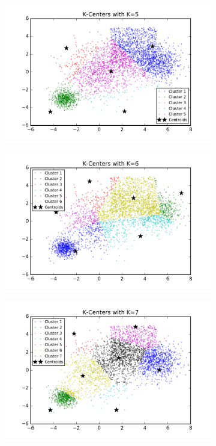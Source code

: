 \begin{figure}[htb]
\begin{subfigure}[b]{0.475\textwidth}
            \includegraphics[width=\textwidth]{./figures/bigClustering_kCenter_5.png}
        \end{subfigure}
        \hfill
        \begin{subfigure}[b]{0.475\textwidth}   
            \centering 
            \includegraphics[width=\textwidth]{./figures/bigClustering_kCenter_6.png}
        \end{subfigure}
        \begin{subfigure}[b]{0.475\textwidth}   
            \centering 
            \includegraphics[width=\textwidth]{./figures/bigClustering_kCenter_7.png}

\end{subfigure}
\end{figure}
